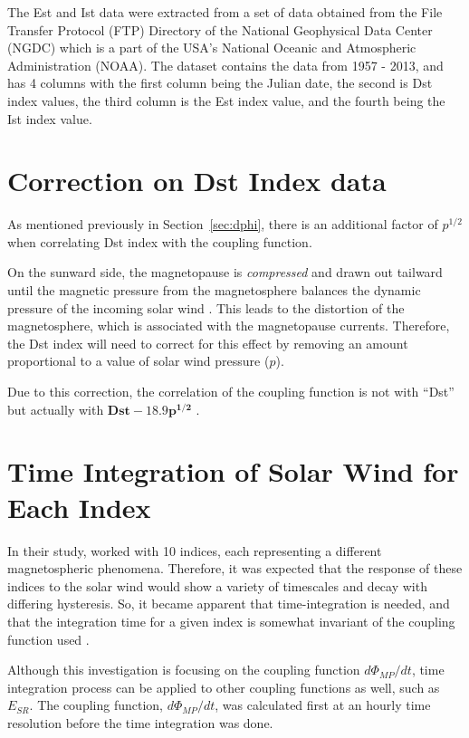 \documentclass[12pt]{report} %
\begin{document}
The Est and Ist data were extracted from a set of data obtained from the File Transfer Protocol (FTP) Directory of the National Geophysical Data Center (NGDC) which is a part of the USA's National Oceanic and Atmospheric Administration (NOAA). The dataset contains the data from 1957 - 2013, and has 4 columns with the first column being the Julian date, the second is Dst index values, the third column is the Est index value, and the fourth being the Ist index value. 
\vspace{-5pt}
\section{Correction on Dst Index data} \label{sec:correction}

As mentioned previously in Section~\ref{sec:dphi}, there is an additional factor of $p^{1/2}$ when correlating Dst index with the coupling function.

On the sunward side, the magnetopause is \emph{compressed} and drawn out tailward until the magnetic pressure from the magnetosphere balances the dynamic pressure of the incoming solar wind \citep{russell74}. This leads to the distortion of the magnetosphere, which is associated with the magnetopause currents. Therefore, the Dst index will need to correct for this effect by removing an amount proportional to a value of solar wind pressure ($p$).
 
   Due to this correction, the correlation of the coupling function is not with ``Dst'' but actually with ${\mathbf{Dst - 18.9 p^{1/2}}}$ \citep{newell07}.

\vspace{-5pt}
\section{Time Integration of Solar Wind for Each Index} \label{sec:timeint}

In their study, \cite{newell07}worked with 10 indices, each representing a different magnetospheric phenomena. Therefore, it was expected that the response of these indices to the solar wind would show a variety of timescales and decay with differing hysteresis. So, it became apparent that time-integration is needed, and that the integration time for a given index is somewhat invariant of the coupling function used \citep{newell07}.

 Although this investigation is focusing on the coupling function $d\Phi_{MP}/dt$, time integration process can be applied to other coupling functions as well, such as $E_{SR}$. The coupling function, $d\Phi_{MP}/dt$, was calculated first at an hourly time resolution before the time integration was done.
\end{document}
